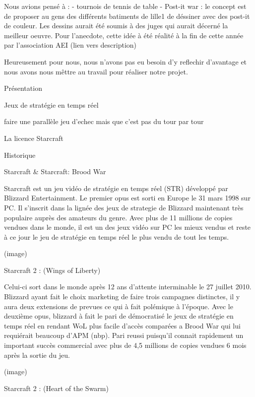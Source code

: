     Nous avions pensé à :
      - tournois de tennis de table
      - Post-it war : le concept est de proposer au gens des différents
    batiments de lille1 de déssiner avec des post-it de couleur. Les dessins
    aurait été soumis à des juges qui aurait décerné la meilleur oeuvre.
    Pour l'anecdote, cette idée à été réalité à la fin de cette année par
    l'association AEI (lien vers description)

    Heureusement pour nous, nous n'avons pas eu besoin d'y reflechir
    d'avantage et nous avons nous mêttre au travail pour réaliser notre
    projet.

Présentation

    Jeux de stratégie en temps réel

    faire une parallèle jeu d'echec mais que c'est pas du tour par
    tour

    La licence Starcraft

      Historique

        Starcraft & Starcraft: Brood War

          Starcraft est un jeu vidéo de stratégie en temps réel (STR) développé
          par Blizzard Entertainment. Le premier opus est sorti en Europe le 31
          mars 1998 sur PC. Il s'inscrit dans la lignée des jeux de strategie de
          Blizzard maintenant très populaire auprès des amateurs du genre. Avec
          plus de 11 millions de copies vendues dans le monde, il est un des
          jeux vidéo sur PC les mieux vendus et reste à ce jour le jeu de
          stratégie en temps réel le plus vendu de tout les temps.

          (image)

        Starcraft 2 : (Wings of Liberty)

          Celui-ci sort dans le monde après 12 ans d'attente
          interminable le 27 juillet 2010. Blizzard ayant fait le choix marketing
          de faire trois campagnes distinctes, il y aura deux extensions de
          prevues ce qui à fait polémique à l'époque. Avec le deuxième opus,
          blizzard à fait le pari de démocratisé le jeux de stratégie en temps
          réel en rendant WoL plus facile d'accès comparées a Brood War qui lui
          requiérait beaucoup d'APM (nbp). Pari reussi puisqu'il connait
          rapidement un important succès commercial avec plus de 4,5 millions de
          copies vendues 6 mois après la sortie du jeu.

          (image)

        Starcraft 2 : (Heart of the Swarm)

